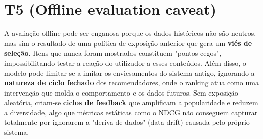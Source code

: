 \section*{T5 (Offline evaluation caveat)}

A avaliação offline pode ser enganosa porque os dados históricos não são neutros, mas sim o resultado de uma política de exposição anterior que gera um \textbf{viés de seleção}. Itens que nunca foram mostrados constituem "pontos cegos", impossibilitando testar a reação do utilizador a esses conteúdos. Além disso, o modelo pode limitar-se a imitar os enviesamentos do sistema antigo, ignorando a \textbf{natureza de ciclo fechado} dos recomendadores, onde o ranking atua como uma intervenção que molda o comportamento e os dados futuros. Sem exposição aleatória, criam-se \textbf{ciclos de feedback} que amplificam a popularidade e reduzem a diversidade, algo que métricas estáticas como o NDCG não conseguem capturar totalmente por ignorarem a "deriva de dados" (data drift) causada pelo próprio sistema.

